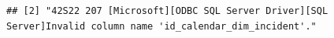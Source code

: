 \documentclass[12pt]{article}\usepackage[]{graphicx}\usepackage[]{color}
\makeatletter
\newenvironment{kframe}{%
 \def\at@end@of@kframe{}%
 \ifinner\ifhmode%
  \def\at@end@of@kframe{\end{minipage}}%
  \begin{minipage}{\columnwidth}%
 \fi\fi%
 \def\FrameCommand##1{\hskip\@totalleftmargin \hskip-\fboxsep
 \colorbox{shadecolor}{##1}\hskip-\fboxsep
     \hskip-\linewidth \hskip-\@totalleftmargin \hskip\columnwidth}%
 \MakeFramed {\advance\hsize-\width
   \@totalleftmargin\z@ \linewidth\hsize
   \@setminipage}}%
 {\par\unskip\endMakeFramed%
 \at@end@of@kframe}
\newenvironment{knitrout}{}{} %
\makeatother
\begin{document}
\begin{knitrout}
\begin{kframe}
\begin{verbatim}
## [2] "42S22 207 [Microsoft][ODBC SQL Server Driver][SQL Server]Invalid column name 'id_calendar_dim_incident'."                                                                                                                                                                                                                                                                                                                                                                                                                                                                                                                                                                                                                                                                                                                                                                                                                                                                                                                                                                                                                                                                                                                                                                                                                                                                                                                                                                                                                                                                                                                                                                                                                                                                                                                                                                                                                                                                                                                                                                                                                                                                                                                                                                                                                                                                                                                                                                                                                                                                                                                     

\end{verbatim}
\end{kframe}
\end{knitrout}
\end{document}
